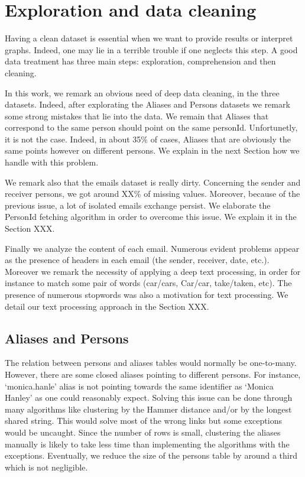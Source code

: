 \documentclass[11pt]{article}
\begin{document}
\section{Exploration and data cleaning}

Having a clean dataset is essential when we want to provide results or interpret graphs. Indeed, one may lie in a terrible trouble if one neglects this step. A good data treatment has three main steps: exploration, comprehension and then cleaning.

In this work, we remark an obvious need of deep data cleaning, in the three datasets. Indeed, after explorating the Aliases and Persons datasets we remark some strong mistakes that lie into the data. We remain that Aliases that correspond to the same person should point on the same personId. Unfortunetly, it is not the case. Indeed, in about 35\% of cases, Aliases that are obviously the same points however on different persons. We explain in the next Section how we handle with this problem.

We remark also that the emails dataset is really dirty. Concerning the sender and receiver persons, we got around XX\% of missing values. Moreover, because of the previous issue, a lot of isolated emails exchange persist. We elaborate the PersonId fetching algorithm in order to overcome this issue. We explain it in the Section XXX.

Finally we analyze the content of each email. Numerous evident problems appear as the presence of headers in each email (the sender, receiver, date, etc.). Moreover we remark the necessity of applying a deep text processing, in order for instance to match some pair of words (car/cars, Car/car, take/taken, etc). The presence of numerous stopwords was also a motivation for text processing. We detail our text processing approach in the Section XXX.

\subsection{Aliases and Persons}

The relation between persons and aliases tables would normally be one-to-many. However, there are some closed aliases pointing to different persons. For instance, `monica.hanle' alias is not pointing towards the same identifier as `Monica Hanley' as one could reasonably expect. Solving this issue can be done through many algorithms like clustering by the Hammer distance and/or by the longest shared string. This would solve most of the wrong links but some exceptions would be uncaught. Since the number of rows is small, clustering the aliases manually is likely to take less time than implementing the algorithms with the exceptions. Eventually, we reduce the size of the persons table by around a third which is not negligible.
\end{document}
